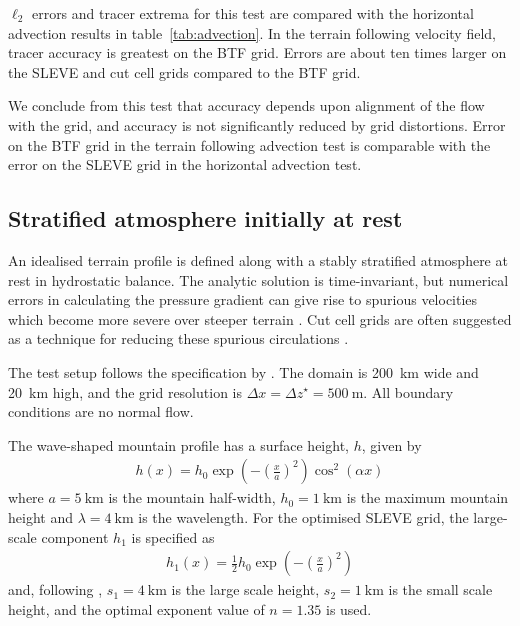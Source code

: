 \documentclass{ametsoc}
\begin{document}
$\ell_2$ errors and tracer extrema for this test are compared with the horizontal advection results in table~\ref{tab:advection}.  In the terrain following velocity field, tracer accuracy is greatest on the BTF grid.  Errors are about ten times larger on the SLEVE and cut cell grids compared to the BTF grid.

We conclude from this test that accuracy depends upon alignment of the flow with the grid, and accuracy is not significantly reduced by grid distortions.  Error on the BTF grid in the terrain following advection test is comparable with the error on the SLEVE grid in the horizontal advection test.

\subsection{Stratified atmosphere initially at rest}
\label{sec:resting}

An idealised terrain profile is defined along with a stably stratified atmosphere at rest in hydrostatic balance.  The analytic solution is time-invariant, but numerical errors in calculating the pressure gradient can give rise to spurious velocities which become more severe over steeper terrain \citep{klemp2011}.  Cut cell grids are often suggested as a technique for reducing these spurious circulations \citep{yamazaki-satomura2010,jebens2011,good2014}.

The test setup follows the specification by \cite{klemp2011}.  The domain is \SI{200}{\kilo\meter} wide and \SI{20}{\kilo\meter} high, and the grid resolution is \(\Delta x = \Delta z^\star = \SI{500}{\meter}\).  All boundary conditions are no normal flow.

The wave-shaped mountain profile has a surface height, $h$, given by
\begin{align}
	h(x) = h_0 \exp \left( - \left( \frac{x}{a} \right)^2 \right) \cos^2 \left( \alpha x \right) \label{eqn:resting:mountain}
\end{align}
where $a = \SI{5}{\kilo\meter}$ is the mountain half-width, $h_0 = \SI{1}{\kilo\meter}$ is the maximum mountain height and $\lambda = \SI{4}{\kilo\meter}$ is the wavelength.  For the optimised SLEVE grid, the large-scale component $h_1$ is specified as
\begin{align}
h_1(x) = \frac{1}{2} h_0 \exp \left( - \left( \frac{x}{a} \right)^2 \right)
\end{align}
and, following \cite{leuenberger2010}, $s_1 = \SI{4}{\kilo\meter}$ is the large scale height, $s_2 = \SI{1}{\kilo\meter}$ is the small scale height, and the optimal exponent value of $n = 1.35$ is used.
\end{document}
